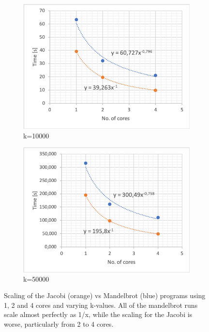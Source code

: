 \documentclass{article}
\begin{document}
\begin{figure}[h]
\begin{subfigure}{.49\textwidth}
  \includegraphics[width=1\linewidth]{k10000.png}
  \caption{k=10000}
  \label{fig:foursub3}
\end{subfigure}
\begin{subfigure}{.49\textwidth}
  \centering
  \includegraphics[width=1\linewidth]{k50000.png}
  \caption{k=50000}
  \label{fig:foursub4}
\end{subfigure}
\caption{Scaling of the Jacobi (orange) vs Mandelbrot (blue) programs using 1, 2 and 4 cores and varying k-values. All of the mandelbrot runs scale almost perfectly as 1/x, while the scaling for the Jacobi is worse, particularly from 2 to 4 cores.}
\label{fig:mandel}
\end{figure}
\end{document}
